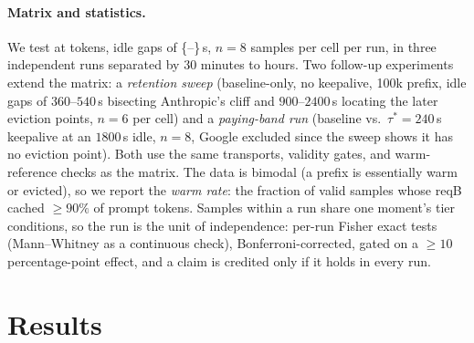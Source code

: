 \documentclass[10pt,twocolumn]{article}
\providecommand{\dataIdles}{--}\providecommand{\worstBaselineHit}{--}\providecommand{\worstBaselineDesc}{--}%
\begin{document}
\paragraph{Matrix and statistics.}
We test \dataVendorsNice{} at \dataSizes{} tokens, idle gaps of
\{\dataIdles\}\,s, $n{=}8$ samples per cell per run, in three independent
runs separated by 30 minutes to hours. Two follow-up experiments extend the
matrix: a \emph{retention sweep} (baseline-only, no keepalive, 100k prefix,
idle gaps of $360$--$540$\,s bisecting Anthropic's cliff and $900$--$2400$\,s
locating the later eviction points, $n{=}6$ per cell) and a \emph{paying-band
run} (baseline vs.\ $\tau^{\ast}{=}240$\,s keepalive at an $1800$\,s idle,
$n{=}8$, Google excluded since the sweep shows it has no eviction point). Both
use the same transports, validity gates, and warm-reference checks as the
matrix. The data is bimodal (a prefix is essentially warm
or evicted), so we report the \emph{warm rate}: the fraction of valid samples
whose reqB cached ${\geq}90\%$ of prompt tokens. Samples within a run share one
moment's tier conditions, so the run is the unit of independence: per-run
Fisher exact tests (Mann--Whitney as a continuous check), Bonferroni-corrected,
gated on a ${\geq}10$ percentage-point effect, and a claim is credited only if
it holds in every run.

\section{Results}
\end{document}
